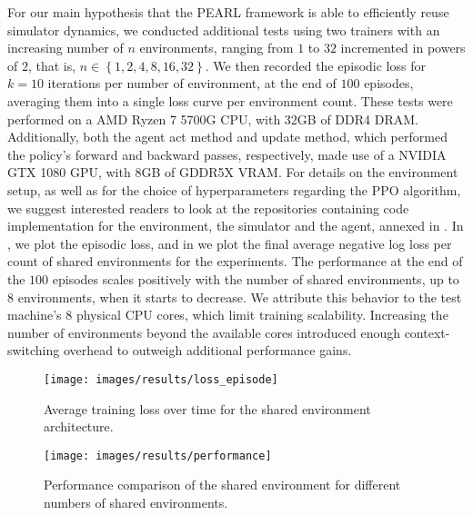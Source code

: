 For our main hypothesis that the PEARL framework is able to efficiently reuse simulator dynamics, we conducted additional tests using two trainers with an
increasing number of $n$ environments, ranging from $1$ to $32$ incremented in powers of $2$, that is, $n \in \left\{1, 2, 4, 8, 16, 32\right\}$.
We then recorded the episodic loss for $k = 10$ iterations per number of environment, at the end of $100$ episodes, averaging them into a single loss curve per environment count.
These tests were performed on a AMD Ryzen 7 5700G CPU, with 32GB of DDR4 DRAM.
Additionally, both the agent act method and update method, which performed the policy's forward and backward passes, respectively,
made use of a NVIDIA GTX 1080 GPU, with 8GB of GDDR5X VRAM.
For details on the environment setup, as well as for the choice of hyperparameters regarding the PPO algorithm,
we suggest interested readers to look at the repositories containing code implementation for the environment,
the simulator and the agent, annexed in .
In , we plot the episodic loss, and in  we plot the final average negative log loss per count of shared environments for the experiments.
The performance at the end of the $100$ episodes scales positively with the number of shared environments, up to $8$ environments,
when it starts to decrease.
We attribute this behavior to the test machine's $8$ physical CPU cores, which limit training scalability.
Increasing the number of environments beyond the available cores introduced enough context-switching overhead to outweigh additional performance gains.

\begin{figure}[htbp]
    \begin{minipage}[t]{0.48\textwidth}
        \centering
        \texttt{[image: images/results/loss\_episode]}
        \caption{Average training loss over time for the shared environment architecture.}
        \label{fig:loss}
    \end{minipage}
    \hfill
    \begin{minipage}[t]{0.48\textwidth}
        \centering
        \texttt{[image: images/results/performance]}
        \caption{Performance comparison of the shared environment for different numbers of shared environments.}
        \label{fig:performance}
    \end{minipage}
\end{figure}

